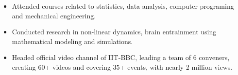 \documentclass[10pt,a4paper,ragged2e,withhyper]{altacv}
\begin{document}
\begin{itemize}
\item Attended courses related to statistics, data analysis, computer programing and mechanical engineering.
\item Conducted research in non-linear dynamics, brain entrainment using mathematical modeling and simulations.
\item Headed official video channel of IIT-BBC, leading a team of 6 conveners, creating 60+ videos and covering 35+ events, with nearly 2 million views.
\end{itemize}
\end{document}

